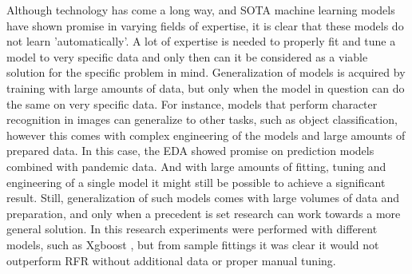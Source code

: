Although technology has come a long way, and SOTA machine learning models have shown promise in varying fields of expertise, it is clear that these models do not learn 'automatically'. A lot of expertise is needed to properly fit and tune a model to very specific data and only then can it be considered as a viable solution for the specific problem in mind. Generalization of models is acquired by training with large amounts of data, but only when the model in question can do the same on very specific data. For instance, models that perform character recognition in images can generalize to other tasks, such as object classification, however this comes with complex engineering of the models and large amounts of prepared data. In this case, the EDA showed promise on prediction models combined with pandemic data. And with large amounts of fitting, tuning and engineering of a single model it might still be possible to achieve a significant result. Still, generalization of such models comes with large volumes of data and preparation, and only when a precedent is set research can work towards a more general solution. In this research experiments were performed with different models, such as Xgboost \cite{chen2016xgboost}, but from sample fittings it was clear it would not outperform RFR without additional data or proper manual tuning.


